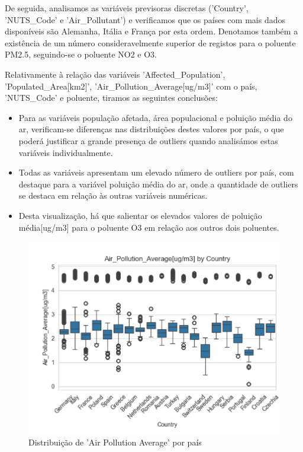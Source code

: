 \documentclass[conference]{IEEEtran}
\begin{document}
De seguida, analisamos as variáveis previsoras discretas ('Country', 'NUTS\_Code' e 'Air\_Pollutant') e verificamos que os países com mais dados disponíveis são Alemanha, Itália e França por esta ordem. Denotamos também a existência de um número consideravelmente superior de registos para o poluente PM2.5, seguindo-se o poluente NO2 e O3.

Relativamente à relação das variáveis 'Affected\_Population', 'Populated\_Area[km2]', 'Air\_Pollution\_Average[ug/m3]' com o país, 'NUTS\_Code' e poluente, tiramos as seguintes conclusões:
\begin{itemize}
	\item Para as variáveis população afetada, área populacional e poluição média do ar, verificam-se diferenças nas distribuições destes valores por país, o que poderá justificar a grande presença de outliers quando analisámos estas variáveis individualmente.
	\item Todas as variáveis apresentam um elevado número de outliers por país, com destaque para a variável poluição média do ar, onde a quantidade de outliers se destaca em relação às outras variáveis numéricas.
	\item Desta visualização, há que salientar os elevados valores de poluição média[ug/m3] para o poluente O3 em relação aos outros dois poluentes.  
\end{itemize}

\begin{figure}[h]
	\centering
	\includegraphics[width=0.8\linewidth]{AirPollutionAvgByCountry}
	\caption{Distribuição de 'Air Pollution Average' por país}
	\label{fig:AvgByCountry}
\end{figure}
\end{document}
